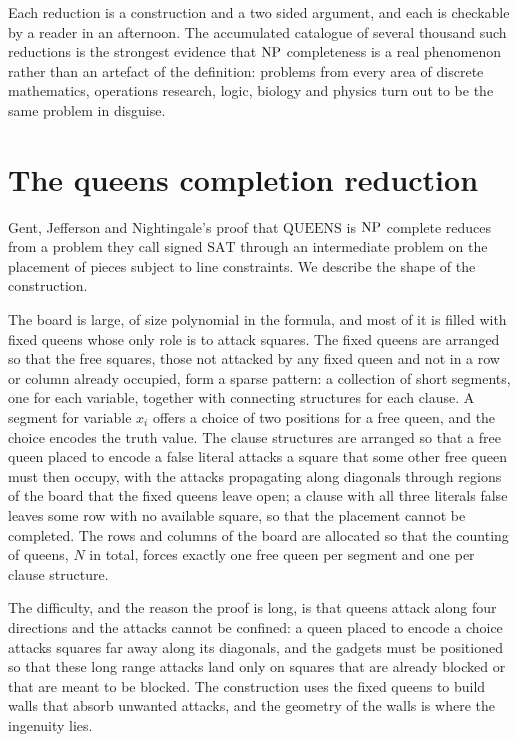 Each reduction is a construction and a two sided argument, and each is checkable by a reader in an afternoon. The accumulated catalogue of several thousand such reductions is the strongest evidence that $\mathrm{NP}$ completeness is a real phenomenon rather than an artefact of the definition: problems from every area of discrete mathematics, operations research, logic, biology and physics turn out to be the same problem in disguise.

\section{The queens completion reduction}

Gent, Jefferson and Nightingale's proof that $\mathrm{QUEENS}$ is $\mathrm{NP}$ complete reduces from a problem they call signed $\mathrm{SAT}$ through an intermediate problem on the placement of pieces subject to line constraints. We describe the shape of the construction.

The board is large, of size polynomial in the formula, and most of it is filled with fixed queens whose only role is to attack squares. The fixed queens are arranged so that the free squares, those not attacked by any fixed queen and not in a row or column already occupied, form a sparse pattern: a collection of short segments, one for each variable, together with connecting structures for each clause. A segment for variable $x_i$ offers a choice of two positions for a free queen, and the choice encodes the truth value. The clause structures are arranged so that a free queen placed to encode a false literal attacks a square that some other free queen must then occupy, with the attacks propagating along diagonals through regions of the board that the fixed queens leave open; a clause with all three literals false leaves some row with no available square, so that the placement cannot be completed. The rows and columns of the board are allocated so that the counting of queens, $N$ in total, forces exactly one free queen per segment and one per clause structure.

The difficulty, and the reason the proof is long, is that queens attack along four directions and the attacks cannot be confined: a queen placed to encode a choice attacks squares far away along its diagonals, and the gadgets must be positioned so that these long range attacks land only on squares that are already blocked or that are meant to be blocked. The construction uses the fixed queens to build walls that absorb unwanted attacks, and the geometry of the walls is where the ingenuity lies.

